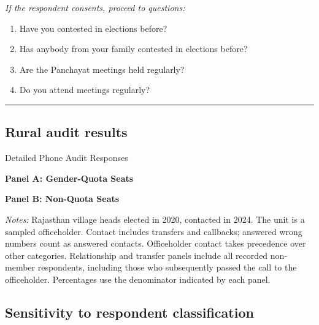 \textit{If the respondent consents, proceed to questions:}
\begin{enumerate}
    \item Have you contested in elections before?
    \item Has anybody from your family contested in elections before?
    \item Are the Panchayat meetings held regularly?
    \item Do you attend meetings regularly?
\end{enumerate}

\noindent\rule{\linewidth}{0.4pt}

\clearpage
\subsection{Rural audit results}

\begin{table}[!htbp]
    \centering
    \caption{Detailed Phone Audit Responses}
    \label{tab:phone_detail}
    \setlength{\tabcolsep}{4pt}

    \begin{subtable}[t]{0.45\linewidth}
        \centering\scriptsize
        \caption*{\textbf{Panel A: Gender-Quota Seats}}
        
    \end{subtable}
    \hspace{2em}
    \begin{subtable}[t]{0.45\linewidth}
        \centering\scriptsize
        \caption*{\textbf{Panel B: Non-Quota Seats}}
        
    \end{subtable}

    \vspace{\medskipamount}

    \parbox{0.9\textwidth}{\scriptsize
        \emph{Notes:} Rajasthan village heads elected in 2020, contacted in 2024. The unit is a sampled officeholder. Contact includes transfers and callbacks; answered wrong numbers count as answered contacts. Officeholder contact takes precedence over other categories. Relationship and transfer panels include all recorded non-member respondents, including those who subsequently passed the call to the officeholder. Percentages use the denominator indicated by each panel.

    }
\end{table}
\FloatBarrier

\clearpage
\subsection{Sensitivity to respondent classification}

